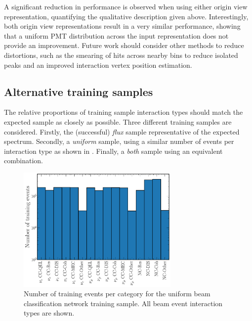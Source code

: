A significant reduction in performance is observed when using either origin view representation,
quantifying the qualitative description given above. Interestingly, both origin view
representations result in a very similar performance, showing that a uniform PMT distribution
across the input representation does not provide an improvement. Future work should consider other
methods to reduce distortions, such as the smearing of hits across nearby bins to reduce isolated
peaks and an improved interaction vertex position estimation.

\subsection{Alternative training samples} %
\label{sec:results_samples} %

The relative proportions of training sample interaction types should match the expected sample as
closely as possible. Three different training samples are considered. Firstly, the (successful)
\emph{flux} sample representative of the expected spectrum. Secondly, a \emph{uniform} sample,
using a similar number of events per interaction type as shown in
. Finally, a \emph{both} sample using an equivalent
combination.

\begin{figure} %
    \includegraphics[width=0.7\textwidth]{diagrams/7-results/explore_uniform_training_sample.pdf}
    \caption[Number of training events per category for the uniform beam classification network
        training sample] {Number of training events per category for the uniform beam
        classification network training sample. All beam event interaction types are shown.}
    \label{fig:explore_uniform_training_sample}
\end{figure}

